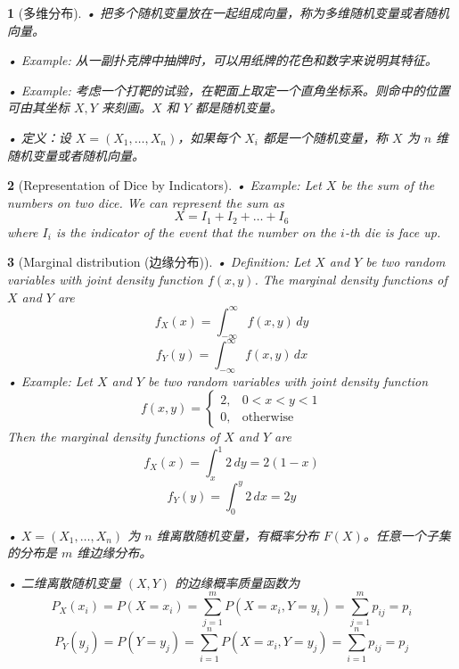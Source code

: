 \documentclass[UTF8]{report}
\theoremstyle{MyLineTheoremStyle} %
\theoremstyle{MyBlockTheoremStyle} %
\theoremstyle{MySubsubsectionStyle} %
\newtheorem{definition}{}
\begin{document}
\begin{definition}[多维分布]
    • 把多个随机变量放在一起组成向量，称为多维随机变量或者随机向量。\par
    • Example: 从一副扑克牌中抽牌时，可以用纸牌的花色和数字来说明其特征。\par
    • Example: 考虑一个打靶的试验，在靶面上取定一个直角坐标系。则命中的位置可由其坐标 \(X, Y\) 来刻画。\(X\) 和 \(Y\) 都是随机变量。\par
    • 定义：设 \(X = (X_1, \ldots, X_n)\)，如果每个 \(X_i\) 都是一个随机变量，称 \(X\) 为 \(n\) 维随机变量或者随机向量。
\end{definition}

\begin{definition}[Representation of Dice by Indicators]
    • Example: Let \(X\) be the sum of the numbers on two dice. We can represent the sum as
    \[
    X = I_1 + I_2 + \ldots + I_6
    \]
    where \(I_i\) is the indicator of the event that the number on the \(i\)-th die is face up.
\end{definition}

\begin{definition}[Marginal distribution (边缘分布)]
    • Definition: Let \(X\) and \(Y\) be two random variables with joint density function \(f(x, y)\). The marginal density functions of \(X\) and \(Y\) are
    \[
    f_X(x) = \int_{-\infty}^{\infty} f(x, y) \, dy
    \]
    \[
    f_Y(y) = \int_{-\infty}^{\infty} f(x, y) \, dx
    \]
    • Example: Let \(X\) and \(Y\) be two random variables with joint density function
    \[
    f(x, y) = 
    \begin{cases}
        2, & 0 < x < y < 1 \\
        0, & \text{otherwise}
    \end{cases}
    \]
    Then the marginal density functions of \(X\) and \(Y\) are
    \[
    f_X(x) = \int_{x}^{1} 2 \, dy = 2(1 - x)
    \]
    \[
    f_Y(y) = \int_{0}^{y} 2 \, dx = 2y
    \]\par
    • \(X = (X_1, \ldots, X_n)\) 为 \(n\) 维离散随机变量，有概率分布 \(F(X)\)。任意一个子集的分布是 \(m\) 维边缘分布。\par
    • 二维离散随机变量 \((X, Y)\) 的边缘概率质量函数为
    \[
    P_X(x_i) = P(X = x_i) = \sum_{j=1}^{m} P(X = x_i, Y = y_i) = \sum_{j=1}^{m} p_{ij} = p_i
    \]
    \[
    P_Y(y_j) = P(Y = y_j) = \sum_{i=1}^{n} P(X = x_i, Y = y_j) = \sum_{i=1}^{n} p_{ij} = p_j
    \]
\end{definition}
\end{document}
